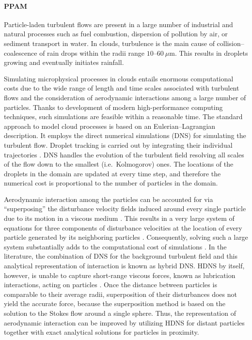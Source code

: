 \documentclass[../thesis.tex]{subfiles}
\begin{document}
\paragraph{PPAM}
Particle-laden turbulent flows are present in a large number of industrial and natural processes such as fuel combustion, dispersion of pollution by air, or sediment transport in water. In clouds, turbulence is the main cause of collision--coalescence of rain drops within the radii range $10$--$60~\mu$m. This results in droplets growing and eventually initiates rainfall.

Simulating microphysical processes in clouds entails enormous computational costs due to the wide range of length and time scales associated with turbulent flows and the consideration of aerodynamic interactions among a large number of particles. Thanks to development of modern high-performance computing techniques, such simulations are feasible within a reasonable time. The standard approach to model cloud processes is based on an Eulerian--Lagrangian description. It employs the direct numerical simulations (DNS) for simulating the turbulent flow. Droplet tracking is carried out by integrating their individual trajectories \cite{WM93}. DNS handles the evolution of the turbulent field resolving all scales of the flow down to the smallest (i.e.~Kolmogorov) ones. The locations of the droplets in the domain are updated at every time step, and therefore the numerical cost is proportional to the number of particles in the domain.

Aerodynamic interaction among the particles can be accounted for via ``superposing'' the disturbance velocity fields induced around every single particle due to its motion in a viscous medium \cite{WAG05}. This results in a very large system of equations for three components of disturbance velocities at the location of every particle generated by its neighboring particles \cite{AGW07}. Consequently, solving such a large system substantially adds to the computational cost of simulations \cite{APCRW14}. In the literature, the combination of DNS for the background turbulent field and this analytical representation of interaction is known as hybrid DNS. HDNS by itself, however, is unable to capture short-range viscous forces, known as lubrication interactions, acting on particles \cite{WAG05}. Once the distance between particles is comparable to their average radii, superposition of their disturbances does not yield the accurate force, because the superposition method is based on the solution to the Stokes flow around a single sphere. Thus, the representation of aerodynamic interaction can be improved by utilizing HDNS \cite{AGW07} for distant particles together with exact analytical solutions \cite{JO84} for particles in proximity.
\end{document}
